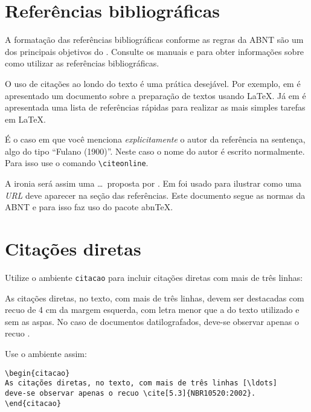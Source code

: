 \section{Referências bibliográficas}\label{sec:referencias}

A formatação das referências bibliográficas conforme as regras da ABNT são um dos principais objetivos do \abnTeX. Consulte os manuais  e  para obter informações sobre como utilizar as referências bibliográficas.


O uso de citações ao londo do texto é uma prática desejável. Por exemplo, em \cite{lamport94} é apresentado um documento sobre a preparação de textos usando \LaTeX. Já em \cite{goossens94} é apresentada uma lista de referências rápidas para realizar as mais simples tarefas em \LaTeX.

É o caso em que você menciona \emph{explicitamente} o autor da referência na sentença, algo
do tipo ``Fulano (1900)''. Neste caso o nome do autor é escrito
normalmente. Para isso use o comando \verb+\citeonline+.

A ironia será assim uma \ldots\ proposta  por . Em \cite{exemplo} foi usado para ilustrar como uma \textit{URL} deve aparecer na seção das referências. Este documento segue as normas da \gls{ABNT} e para isso faz uso do pacote \gls{abnTeX}.


\section{Citações diretas}
\label{sec-citacao}

Utilize o ambiente \texttt{citacao} para incluir
citações diretas com mais de três linhas:

\begin{citacao}
As citações diretas, no texto, com mais de três linhas, devem ser
destacadas com recuo de 4 cm da margem esquerda, com letra menor que a do texto
utilizado e sem as aspas. No caso de documentos datilografados, deve-se
observar apenas o recuo \cite[5.3]{NBR10520:2002}.
\end{citacao}

Use o ambiente assim:

\begin{verbatim}
\begin{citacao}
As citações diretas, no texto, com mais de três linhas [\ldots] 
deve-se observar apenas o recuo \cite[5.3]{NBR10520:2002}.
\end{citacao}
\end{verbatim}

